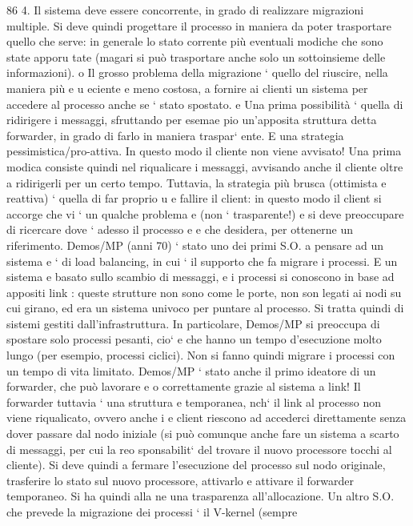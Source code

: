 \documentclass[a4paper,12pt]{article}
\begin{document}
86
4. Il sistema deve essere concorrente, in grado di realizzare migrazioni multiple.
Si deve quindi progettare il processo in maniera da poter trasportare quello che
serve: in generale lo stato corrente più eventuali modiche che sono state apporu
tate (magari si può trasportare anche solo un sottoinsieme delle informazioni).
o
Il grosso problema della migrazione ` quello del riuscire, nella maniera più
e
u
eciente e meno costosa, a fornire ai clienti un sistema per accedere al processo
anche se ` stato spostato.
e
Una prima possibilità ` quella di ridirigere i messaggi, sfruttando per esemae
pio un'apposita struttura detta forwarder, in grado di farlo in maniera traspar`
ente. E una strategia pessimistica/pro-attiva. In questo modo il cliente non
viene avvisato! Una prima modica consiste quindi nel riqualicare i messaggi,
avvisando anche il cliente oltre a ridirigerli per un certo tempo.
Tuttavia, la strategia più brusca (ottimista e reattiva) ` quella di far proprio
u
e
fallire il client: in questo modo il client si accorge che vi ` un qualche problema
e
(non ` trasparente!) e si deve preoccupare di ricercare dove ` adesso il processo
e
e
che desidera, per ottenerne un riferimento.
Demos/MP (anni 70) ` stato uno dei primi S.O. a pensare ad un sistema
e
`
di load balancing, in cui ` il supporto che fa migrare i processi. E un sistema
e
basato sullo scambio di messaggi, e i processi si conoscono in base ad appositi
link : queste strutture non sono come le porte, non son legati ai nodi su cui
girano, ed era un sistema univoco per puntare al processo. Si tratta quindi di
sistemi gestiti dall'infrastruttura.
In particolare, Demos/MP si preoccupa di spostare solo processi pesanti, cio`
e
che hanno un tempo d'esecuzione molto lungo (per esempio, processi ciclici).
Non si fanno quindi migrare i processi con un tempo di vita limitato.
Demos/MP ` stato anche il primo ideatore di un forwarder, che può lavorare
e
o
correttamente grazie al sistema a link! Il forwarder tuttavia ` una struttura
e
temporanea, nch` il link al processo non viene riqualicato, ovvero anche i
e
client riescono ad accederci direttamente senza dover passare dal nodo iniziale
(si può comunque anche fare un sistema a scarto di messaggi, per cui la reo
sponsabilit` del trovare il nuovo processore tocchi al cliente). Si deve quindi
a
fermare l'esecuzione del processo sul nodo originale, trasferire lo stato sul nuovo
processore, attivarlo e attivare il forwarder temporaneo. Si ha quindi alla ne
una trasparenza all'allocazione.
Un altro S.O. che prevede la migrazione dei processi ` il V-kernel (sempre
\end{document}
